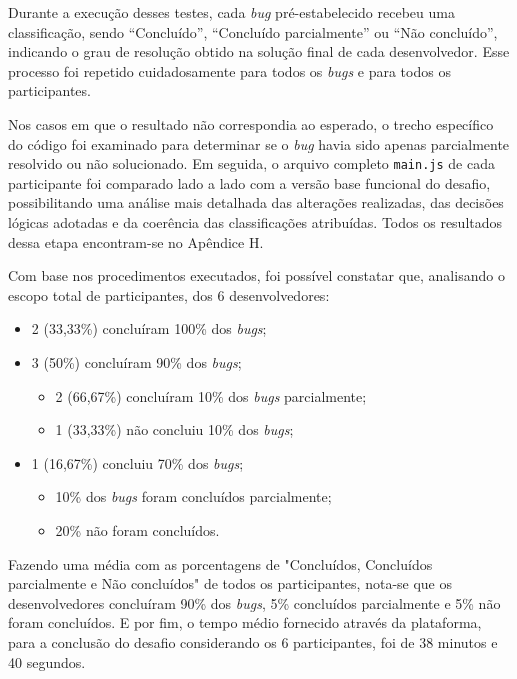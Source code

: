 \documentclass[english,brazilian]{UNISINOSartigo} %
\begin{document}
Durante a execução desses testes, cada \textit{bug} pré-estabelecido recebeu uma classificação, sendo “Concluído”, “Concluído parcialmente” ou “Não concluído”, indicando o grau de resolução obtido na solução final de cada desenvolvedor. Esse processo foi repetido cuidadosamente para todos os \textit{bugs} e para todos os participantes.

Nos casos em que o resultado não correspondia ao esperado, o trecho específico do código foi examinado para determinar se o \textit{bug} havia sido apenas parcialmente resolvido ou não solucionado. Em seguida, o arquivo completo \texttt{main.js} de cada participante foi comparado lado a lado com a versão base funcional do desafio, possibilitando uma análise mais detalhada das alterações realizadas, das decisões lógicas adotadas e da coerência das classificações atribuídas. Todos os resultados dessa etapa encontram-se no Apêndice H.

Com base nos procedimentos executados, foi possível constatar que, analisando o escopo total de participantes, dos 6 desenvolvedores:

\begin{itemize}[leftmargin=1cm, itemsep=0.1em, topsep=0.1em]
    \item 2 (33,33\%) concluíram 100\% dos \textit{bugs};
    \item 3 (50\%) concluíram 90\% dos \textit{bugs};
    \begin{itemize}[leftmargin=1.2cm, itemsep=0.1em, topsep=0.1em]
        \item 2 (66,67\%) concluíram 10\% dos \textit{bugs} parcialmente;
        \item 1 (33,33\%) não concluiu 10\% dos \textit{bugs};
    \end{itemize}
    \item 1 (16,67\%) concluiu 70\% dos \textit{bugs};
    \begin{itemize}[leftmargin=1.2cm, itemsep=0.1em, topsep=0.1em]
        \item 10\% dos \textit{bugs} foram concluídos parcialmente;
        \item 20\% não foram concluídos.
    \end{itemize}
\end{itemize}

Fazendo uma média com as porcentagens de "Concluídos, Concluídos parcialmente e Não concluídos" de todos os participantes, nota-se que os desenvolvedores concluíram 90\% dos \textit{bugs}, 5\% concluídos parcialmente e 5\% não foram concluídos. E por fim, o tempo médio fornecido através da plataforma, para a conclusão do desafio considerando os 6 participantes, foi de 38 minutos e 40 segundos.
\end{document}
